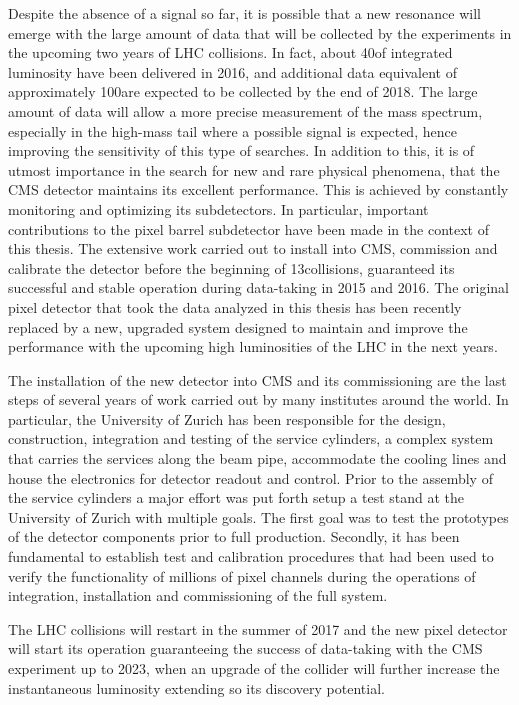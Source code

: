 Despite the absence of a signal so far, it is possible that a new resonance will emerge with the large amount of data that will be collected by the experiments in the upcoming two years of LHC collisions.
In fact, about 40\fbinv of integrated luminosity have been delivered in 2016, and additional data equivalent of approximately 100\fbinv are expected to be collected by the end of 2018.
The large amount of data will allow a more precise measurement of the mass spectrum, especially in the high-mass tail where a possible signal is expected, hence improving the sensitivity of this type of searches.
In addition to this, it is of utmost importance in the search for new and rare physical phenomena, that the CMS detector maintains its excellent performance.
This is achieved by constantly monitoring and optimizing its subdetectors. In particular, important contributions to the pixel barrel subdetector have been made in the context of this thesis.
The extensive work carried out to install into CMS, commission and calibrate the detector before the beginning of 13\TeV collisions, guaranteed its successful and stable operation during data-taking in 2015 and 2016.
The original pixel detector that took the data analyzed in this thesis has been recently replaced by a new, upgraded system designed to maintain and improve the performance with the upcoming high luminosities of the LHC in the next years.

The installation of the new detector into CMS and its commissioning are the last steps of several years of work carried out by many institutes around the world. In particular, the University of Zurich has been responsible for the design, construction, integration and testing of the service cylinders, a complex system that carries the services along the beam pipe, accommodate the cooling lines and house the electronics for detector readout and control.
Prior to the assembly of the service cylinders a major effort was put forth setup a test stand at the University of Zurich with multiple goals. The first goal was to test the prototypes of the detector components prior to full production. Secondly, it has been fundamental to establish test and calibration procedures that had been used to verify the functionality of millions of pixel channels during the operations of integration, installation and commissioning of the full system.

The LHC collisions will restart in the summer of 2017 and the new pixel detector will start its operation guaranteeing the success of data-taking with the CMS experiment up to 2023, when an upgrade of the collider will further increase the instantaneous luminosity extending so its discovery potential.

